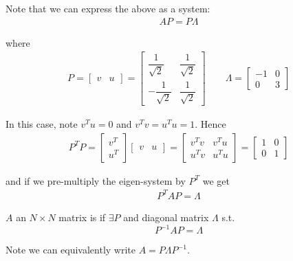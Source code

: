 \documentclass{article}
\begin{document}
\begin{example}
  Note that we can express the above as a system:
  \begin{align*}
    A P
    =
    P \Lambda
  \end{align*}

  where
  \begin{align*}
    P = \begin{bmatrix}
      v & u
    \end{bmatrix}
    =
    \begin{bmatrix}
      \dfrac{1}{\sqrt{2}} & \dfrac{1}{\sqrt{2}} \\
      - \dfrac{1}{\sqrt{2}} & \dfrac{1}{\sqrt{2}}
    \end{bmatrix}
    \quad\quad
    \Lambda = \begin{bmatrix}
      -1 & 0 \\
      0 & 3
    \end{bmatrix}
  \end{align*}

  In this case, note $v^T u = 0$ and $v^T v = u^T u = 1$. Hence
  \begin{align*}
    P^T P
    =
    \begin{bmatrix}
      v^T \\ u^T
    \end{bmatrix}
    \begin{bmatrix}
      v & u
    \end{bmatrix}
    =
    \begin{bmatrix}
      v^T v & v^T u \\
      u^T v & u^T u
    \end{bmatrix}
    =
    \begin{bmatrix}
      1 & 0 \\
      0 & 1
    \end{bmatrix}
  \end{align*}

  and if we pre-multiply the eigen-system by $P^T$ we get
  \begin{align*}
    P^T A P = \Lambda
  \end{align*}
\end{example}

\begin{definition}
  $A$ an $N \times N$ matrix is  if $\exists P$ and diagonal matrix $\Lambda$ s.t.
  \[
    P^{-1} A P = \Lambda
  \]

  Note we can equivalently write $A = P \Lambda P^{-1}$.
\end{definition}
\end{document}
